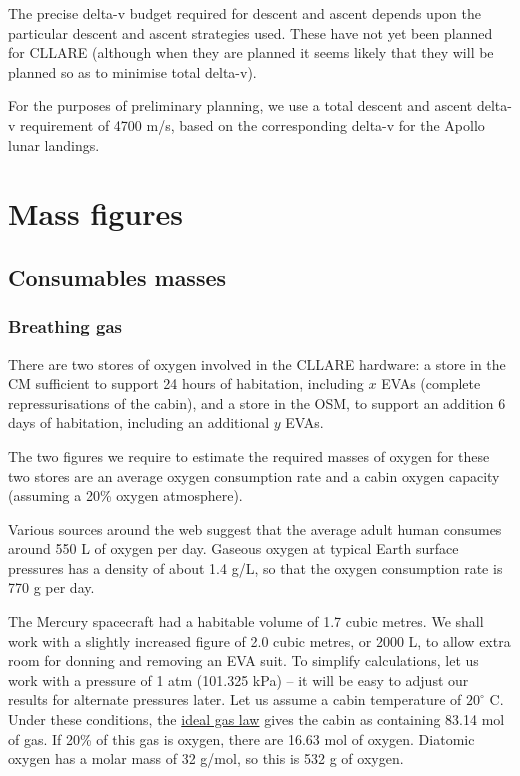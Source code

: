 \documentclass{report}
\begin{document}
The precise delta-v budget required for descent and ascent depends upon the particular descent and ascent strategies used.  These have not yet been planned for CLLARE (although when they are planned it seems likely that they will be planned so as to minimise total delta-v).

For the purposes of preliminary planning, we use a total descent and ascent delta-v requirement of 4700 m/s, based on the corresponding delta-v for the Apollo lunar landings.

\section{Mass figures}

\subsection{Consumables masses}

\subsubsection{Breathing gas}

There are two stores of oxygen involved in the CLLARE hardware: a store in the CM sufficient to support 24 hours of habitation, including $x$ EVAs (complete repressurisations of the cabin), and a store in the OSM, to support an addition 6 days of habitation, including an additional $y$ EVAs.

The two figures we require to estimate the required masses of oxygen for these two stores are an average oxygen consumption rate and a cabin oxygen capacity (assuming a 20\% oxygen atmosphere).

Various sources around the web suggest that the average adult human consumes around 550 L of oxygen per day.  Gaseous oxygen at typical Earth surface pressures has a density of about 1.4 g/L, so that the oxygen consumption rate is 770 g per day. 

The Mercury spacecraft had a habitable volume of 1.7 cubic metres.  We shall work with a slightly increased figure of 2.0 cubic metres, or 2000 L, to allow extra room for donning and removing an EVA suit.  To simplify calculations, let us work with a pressure of 1 atm (101.325 kPa) -- it will be easy to adjust our results for alternate pressures later.  Let us assume a cabin temperature of $20^\circ$ C.  Under these conditions, the \href{http://en.wikipedia.org/wiki/Ideal_gas_law}{ideal gas law} gives the cabin as containing 83.14 mol of gas.  If 20\% of this gas is oxygen, there are 16.63 mol of oxygen.  Diatomic oxygen has a molar mass of 32 g/mol, so this is 532 g of oxygen.
\end{document}
